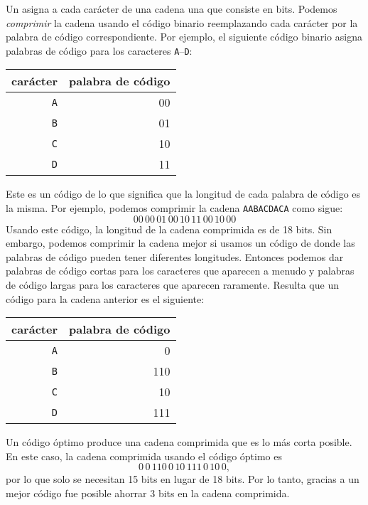 Un  asigna a cada carácter
de una cadena una  que consiste en bits.
Podemos \emph{comprimir} la cadena usando el código binario
reemplazando cada carácter por la
palabra de código correspondiente.
Por ejemplo, el siguiente código binario
asigna palabras de código para los caracteres
\texttt{A}–\texttt{D}:
\begin{center}
\begin{tabular}{rr}
carácter & palabra de código \\
\hline
\texttt{A} & 00 \\
\texttt{B} & 01 \\
\texttt{C} & 10 \\
\texttt{D} & 11 \\
\end{tabular}
\end{center}
Este es un código de 
lo que significa que la longitud de cada
palabra de código es la misma.
Por ejemplo, podemos comprimir la cadena
\texttt{AABACDACA} como sigue:
\[00\,00\,01\,00\,10\,11\,00\,10\,00\]
Usando este código, la longitud de la cadena comprimida
es de 18 bits.
Sin embargo, podemos comprimir la cadena mejor
si usamos un código de 
donde las palabras de código pueden tener diferentes longitudes.
Entonces podemos dar palabras de código cortas para
los caracteres que aparecen a menudo
y palabras de código largas para los caracteres
que aparecen raramente.
Resulta que un código 
para la cadena anterior es el siguiente:
\begin{center}
\begin{tabular}{rr}
carácter & palabra de código \\
\hline
\texttt{A} & 0 \\
\texttt{B} & 110 \\
\texttt{C} & 10 \\
\texttt{D} & 111 \\
\end{tabular}
\end{center}
Un código óptimo produce una cadena comprimida
que es lo más corta posible.
En este caso, la cadena comprimida usando
el código óptimo es
\[0\,0\,110\,0\,10\,111\,0\,10\,0,\]
por lo que solo se necesitan 15 bits en lugar de 18 bits.
Por lo tanto, gracias a un mejor código fue posible
ahorrar 3 bits en la cadena comprimida.

